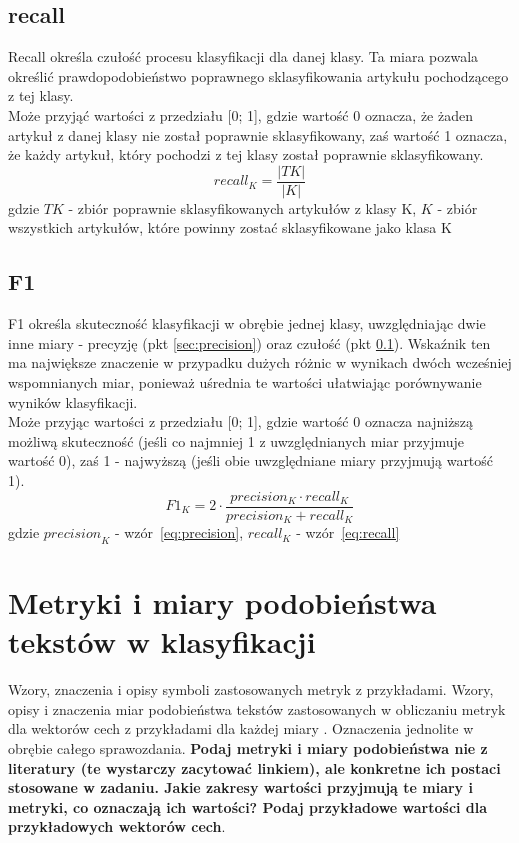 \documentclass{article}
\begin{document}
\subsection{recall} \label{sec:recall}
Recall określa czułość procesu klasyfikacji dla danej klasy. Ta miara pozwala określić prawdopodobieństwo poprawnego sklasyfikowania artykułu pochodzącego z tej klasy. 
\\Może przyjąć wartości z przedziału [0; 1], gdzie wartość 0 oznacza, że żaden artykuł z danej klasy nie został poprawnie sklasyfikowany, zaś wartość 1 oznacza, że każdy artykuł, który pochodzi z tej klasy został poprawnie sklasyfikowany.
\begin{equation} \label{eq:recall}
     recall_K = \frac{\left|TK \right|}{\left|K\right|}
\end{equation}
gdzie \(TK\) - zbiór poprawnie sklasyfikowanych artykułów z klasy K, \(K\) - zbiór wszystkich artykułów, które powinny zostać sklasyfikowane jako klasa K
\subsection{F1}
F1 określa skuteczność klasyfikacji w obrębie jednej klasy, uwzględniając dwie inne miary - precyzję (pkt \ref{sec:precision}) oraz czułość (pkt \ref{sec:recall}). Wskaźnik ten ma największe znaczenie w przypadku dużych różnic w wynikach dwóch wcześniej wspomnianych miar, ponieważ uśrednia te wartości ułatwiając porównywanie wyników klasyfikacji.
\\Może przyjąc wartości z przedziału [0; 1], gdzie wartość 0 oznacza najniższą możliwą skuteczność (jeśli co najmniej 1 z uwzględnianych miar przyjmuje wartość 0), zaś 1 - najwyższą (jeśli obie uwzględniane miary przyjmują wartość 1). 
\begin{equation}
     F1_K = 2 \cdot \frac{precision_K \cdot recall_K}{precision_K + recall_K}
\end{equation}
gdzie \(\textit{precision}_K\) - wzór~\ref{eq:precision}, \(\textit{recall}_K\) - wzór~\ref{eq:recall}

\section{Metryki i miary podobieństwa tekstów w klasyfikacji}
Wzory, znaczenia i opisy symboli zastosowanych metryk z
przykładami. Wzory, opisy i znaczenia miar
podobieństwa tekstów zastosowanych w obliczaniu metryk dla wektorów cech z
przykładami dla każdej miary \cite{niewiadomski08}.  Oznaczenia jednolite w obrębie całego sprawozdania.  {\bf Podaj metryki i miary
podobieństwa nie z literatury (te wystarczy zacytować linkiem), ale konkretne ich
postaci stosowane w zadaniu. Jakie zakresy wartości przyjmują te miary i
metryki, co oznaczają ich wartości? Podaj przykładowe wartości dla przykładowych wektorów cech}. \\ 
\end{document}

